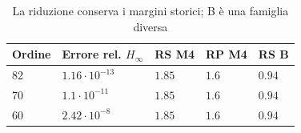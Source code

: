 \begin{table}[htbp]\centering\small
\begin{tabular}{lllll}\toprule
Ordine & Errore rel. $H_\infty$ & RS M4 & RP M4 & RS B\\\midrule
82 & $1.16\cdot10^{-13}$ & $1.85$ & $1.6$ & $0.94$\\
70 & $1.1\cdot10^{-11}$ & $1.85$ & $1.6$ & $0.94$\\
60 & $2.42\cdot10^{-8}$ & $1.85$ & $1.6$ & $0.94$\\
\bottomrule\end{tabular}
\caption{La riduzione conserva i margini storici; B è una famiglia diversa}
\end{table}
